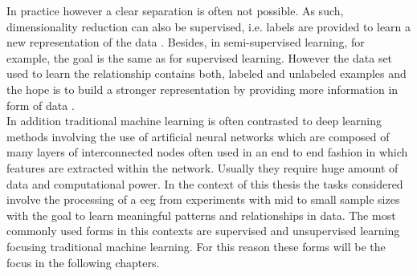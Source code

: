 \noindent In practice however a clear separation is often not possible. As such, dimensionality reduction can also be supervised, i.e. labels are provided to learn a new representation of the data \cite{mcinnes2018umap}. Besides, in semi-supervised learning, for example, the goal is the same as for supervised learning. However the data set used to learn the relationship contains both, labeled and unlabeled examples and the hope is to build a stronger representation by providing more information in form of data \cite{Burkov2019}. \\
In addition traditional machine learning is often contrasted to deep learning methods involving the use of artificial neural networks which are composed of many layers of interconnected nodes often used in an end to end fashion in which features are extracted within the network. Usually they require huge amount of data and computational power. In the context of this thesis the tasks considered involve the processing of a \gls{eeg} from experiments with mid to small sample sizes with the goal to learn meaningful patterns and relationships in data. The most commonly used forms in this contexts are supervised and unsupervised learning focusing traditional machine learning. For this reason these forms will be the focus in the following chapters.

